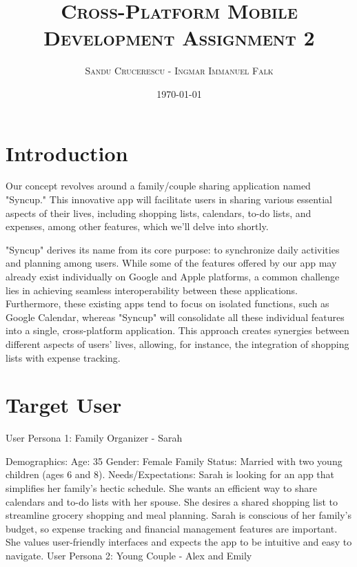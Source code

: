 \documentclass[12pt]{article}
\begin{document}
\title{\textsc{Cross-Platform Mobile Development \linebreak  \large{Assignment 2} }}
\author{\textsc{Sandu Crucerescu - Ingmar Immanuel Falk}}
\date{\textsc{\today}}

\maketitle
\pagebreak

\tableofcontents
\pagebreak

\section{Introduction}

Our concept revolves around a family/couple sharing application named "Syncup." 
This innovative app will facilitate users in sharing various essential aspects of their lives,
 including shopping lists, calendars, to-do lists, and expenses, among other features, which we'll delve into shortly.

"Syncup" derives its name from its core purpose: to synchronize daily activities and planning 
among users. While some of the features offered by our app may already exist individually 
on Google and Apple platforms, a common challenge lies in achieving seamless interoperability 
between these applications. Furthermore, these existing apps tend to focus on isolated functions, 
such as Google Calendar, whereas "Syncup" will consolidate all these individual features into a single,
 cross-platform application. This approach creates synergies between different aspects of users' lives, 
 allowing, for instance, the integration of shopping lists with expense tracking.

\section{Target User}

User Persona 1: Family Organizer - Sarah

Demographics:
Age: 35
Gender: Female
Family Status: Married with two young children (ages 6 and 8).
Needs/Expectations:
Sarah is looking for an app that simplifies her family's hectic schedule. She wants an efficient way to share calendars and to-do lists with her spouse.
She desires a shared shopping list to streamline grocery shopping and meal planning.
Sarah is conscious of her family's budget, so expense tracking and financial management features are important.
She values user-friendly interfaces and expects the app to be intuitive and easy to navigate.
User Persona 2: Young Couple - Alex and Emily
\end{document}
